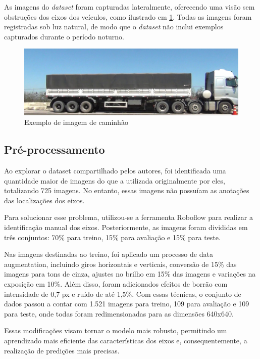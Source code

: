 \documentclass[12pt]{article}
\begin{document}
        As imagens do \textit{dataset} foram capturadas lateralmente, oferecendo uma visão sem obstruções dos eixos dos veículos, como ilustrado em \ref{fig:caminhaoExemplo}. Todas as imagens foram registradas sob luz natural, de modo que o \textit{dataset} não inclui exemplos capturados durante o período noturno.

        \begin{figure}[ht]
            \centering
            \includegraphics[width=.75\textwidth]{Images/20160927102749_color-[ROI-1]-1.jpg}
            \caption{Exemplo de imagem de caminhão}
            \label{fig:caminhaoExemplo}
        \end{figure}

    \subsection{Pré-processamento}

        Ao explorar o dataset compartilhado pelos autores, foi identificada uma quantidade maior de imagens do que a utilizada originalmente por eles, totalizando 725 imagens. No entanto, essas imagens não possuíam as anotações das localizações dos eixos.
        
        Para solucionar esse problema, utilizou-se a ferramenta Roboflow para realizar a identificação manual dos eixos. Posteriormente, as imagens foram divididas em três conjuntos: 70\% para treino, 15\% para avaliação e 15\% para teste.
        
        Nas imagens destinadas ao treino, foi aplicado um processo de data augmentation, incluindo giros horizontais e verticais, conversão de 15\% das imagens para tons de cinza, ajustes no brilho em 15\% das imagens e variações na exposição em 10\%. Além disso, foram adicionados efeitos de borrão com intensidade de 0,7 px e ruído de até 1,5\%. Com essas técnicas, o conjunto de dados passou a contar com 1.521 imagens para treino, 109 para avaliação e 109 para teste, onde todas foram redimensionadas para as dimensões 640x640.
        
        Essas modificações visam tornar o modelo mais robusto, permitindo um aprendizado mais eficiente das características dos eixos e, consequentemente, a realização de predições mais precisas.
\end{document}
